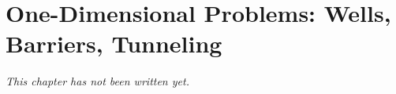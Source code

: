 \chapter{One-Dimensional Problems: Wells, Barriers, Tunneling}\label{ch:b3:wells-barriers-tunneling}


\emph{This chapter has not been written yet.}
